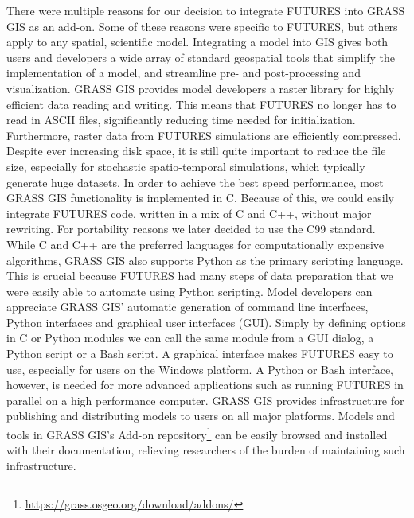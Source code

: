 \documentclass{isprs}
\begin{document}
There were multiple reasons for our decision to integrate FUTURES into GRASS GIS as an add-on. Some of these reasons were specific to FUTURES, but others apply to any spatial, scientific model.
Integrating a model into GIS gives both users and developers
a wide array of standard geospatial tools that simplify the implementation of a model,
and streamline pre- and post-processing and visualization.
%
GRASS GIS provides
model developers
a raster library for highly efficient data reading and writing.
This means that FUTURES no longer has to read in ASCII files,
significantly reducing time needed for initialization.
Furthermore, raster data from FUTURES simulations are efficiently compressed.
Despite ever increasing disk space, it is still quite important to reduce the file size, especially for
stochastic spatio-temporal simulations, which typically generate huge datasets.
In order to achieve the best speed performance,
most GRASS GIS functionality is implemented in C.
Because of this, we could easily integrate FUTURES 
code, written in a mix of C and C++, 
without major rewriting. 
For portability reasons we later decided to use the C99 standard.
While C and C++ are the preferred languages for computationally expensive algorithms,
GRASS GIS also supports Python as the primary scripting language. 
This is crucial because FUTURES had many steps of data preparation that we were easily able to automate using Python scripting. 
%
Model developers can appreciate
GRASS GIS' automatic generation of
command line interfaces, Python interfaces and graphical user interfaces (GUI).
%
Simply by defining
options in C or Python modules
we can call the same module from a GUI dialog, a Python script or a Bash script.
A graphical interface makes FUTURES easy to use,
especially for users on the Windows platform. 
A Python or Bash interface, however, is needed for more advanced applications such as running FUTURES in parallel on a high performance computer.
GRASS GIS provides infrastructure for publishing and distributing models to users on all major platforms.
Models and tools in GRASS GIS's Add-on repository\footnote{\url{https://grass.osgeo.org/download/addons/}}
can be easily browsed and installed with their documentation,
relieving researchers 
of the burden of maintaining 
such
infrastructure.
\end{document}
